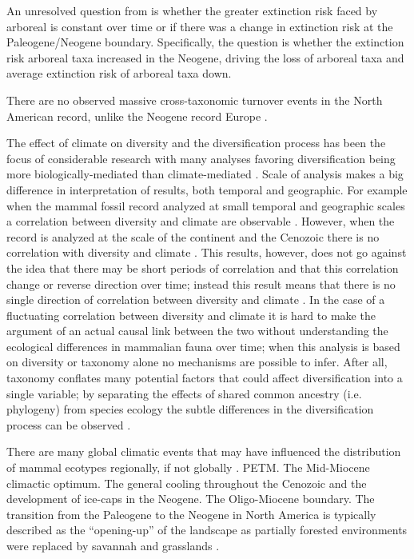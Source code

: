 \documentclass[12pt,letterpaper]{article}
\begin{document}
An unresolved question from \citet{Smits2015b} is whether the greater extinction risk faced by arboreal is constant over time or if there was a change in extinction risk at the Paleogene/Neogene boundary. Specifically, the question is whether the extinction risk arboreal taxa increased in the Neogene, driving the loss of arboreal taxa and average extinction risk of arboreal taxa down. 

There are no observed massive cross-taxonomic turnover events in the North American record, unlike the Neogene record Europe \citep{Alroy2009,Alroy1996a,Eronen2015,Janis1993a,Alroy2000g}.

The effect of climate on diversity and the diversification process has been the focus of considerable research with many analyses favoring diversification being more biologically-mediated than climate-mediated \citep{Alroy1996a,Alroy2000g,Figueirido2012,Clyde1998a}. Scale of analysis makes a big difference in interpretation of results, both temporal and geographic. For example when the mammal fossil record analyzed at small temporal and geographic scales a correlation between diversity and climate are observable \citep{Clyde1998a}. However, when the record is analyzed at the scale of the continent and the Cenozoic there is no correlation with diversity and climate \citep{Alroy2000g}. This results, however, does not go against the idea that there may be short periods of correlation and that this correlation change or reverse direction over time; instead this result means that there is no single direction of correlation between diversity and climate \citep{Figueirido2012}. In the case of a fluctuating correlation between diversity and climate it is hard to make the argument of an actual causal link between the two without understanding the ecological differences in mammalian fauna over time; when this analysis is based on diversity or taxonomy alone no mechanisms are possible to infer. After all, taxonomy conflates many potential factors that could affect diversification into a single variable; by separating the effects of shared common ancestry (i.e. phylogeny) from species ecology the subtle differences in the diversification process can be observed \citep{Smits2015b}.

There are many global climatic events that may have influenced the distribution of mammal ecotypes regionally, if not globally \citep{Zachos2001,Zachos2008}. PETM. The Mid-Miocene climactic optimum. The general cooling throughout the Cenozoic and the development of ice-caps in the Neogene. The Oligo-Miocene boundary. The transition from the Paleogene to the Neogene in North America is typically described as the ``opening-up'' of the landscape as partially forested environments were replaced by savannah and grasslands \citep{Blois2009,Janis1993a,Janis2000,Stromberg2005}.
\end{document}
